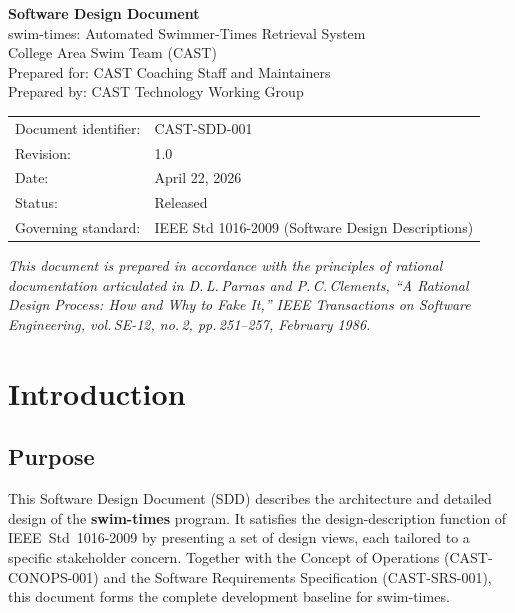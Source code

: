 \documentclass[12pt]{article}
\begin{document}
\begin{titlepage}
  \centering
  \vspace*{2cm}
  {\Huge\bfseries\color{castblue} Software Design Document\\[0.5em]}
  {\Large swim-times: Automated Swimmer-Times Retrieval System}\\[2em]
  {\large College Area Swim Team (CAST)}\\[0.5em]
  {\normalsize Prepared for: CAST Coaching Staff and Maintainers}\\[0.5em]
  {\normalsize Prepared by: CAST Technology Working Group}\\[2em]
  \begin{tabular}{ll}
    Document identifier: & CAST-SDD-001                                \\
    Revision:            & 1.0                                         \\
    Date:                & April 22, 2026                              \\
    Status:              & Released                                    \\
    Governing standard:  & IEEE Std 1016-2009 (Software Design Descriptions) \\
  \end{tabular}
  \vfill
  {\small\textit{This document is prepared in accordance with the principles
  of rational documentation articulated in D.\,L.\,Parnas and P.\,C.\,Clements,
  ``A Rational Design Process: How and Why to Fake It,''
  \textit{IEEE Transactions on Software Engineering}, vol.\,SE-12, no.\,2,
  pp.\,251--257, February 1986.}}
\end{titlepage}

\tableofcontents
\clearpage

\section{Introduction}

\subsection{Purpose}

This Software Design Document (SDD) describes the architecture
and detailed design of the \textbf{swim-times} program.  It
satisfies the design-description function of IEEE~Std~1016-2009
by presenting a set of design views, each tailored to a specific
stakeholder concern.  Together with the Concept of Operations
(CAST-CONOPS-001) and the Software Requirements Specification
(CAST-SRS-001), this document forms the complete development
baseline for swim-times.
\end{document}
